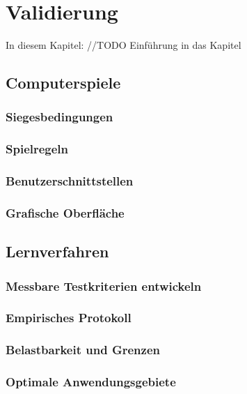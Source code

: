 \chapter{Validierung}
\label{cha:validierung}

In diesem Kapitel: //TODO Einführung in das Kapitel

\section{Computerspiele}

\subsection{Siegesbedingungen}

\subsection{Spielregeln}

\subsection{Benutzerschnittstellen}

\subsection{Grafische Oberfläche}

\section{Lernverfahren}

\subsection{Messbare Testkriterien entwickeln}

\subsection{Empirisches Protokoll}

\subsection{Belastbarkeit und Grenzen}

\subsection{Optimale Anwendungsgebiete}
